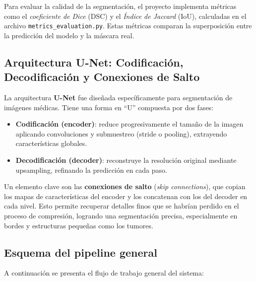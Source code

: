 \documentclass[12pt]{article}
\begin{document}
Para evaluar la calidad de la segmentación, el proyecto implementa métricas como el \textit{coeficiente de Dice} (DSC) y el \textit{Índice de Jaccard} (IoU), calculadas en el archivo \texttt{metrics\_evaluation.py}. Estas métricas comparan la superposición entre la predicción del modelo y la máscara real. \cite{taha2015metrics}

\subsection*{Arquitectura U-Net: Codificación, Decodificación y Conexiones de Salto}  
La arquitectura \textbf{U-Net} fue diseñada específicamente para segmentación de imágenes médicas. Tiene una forma en “U” compuesta por dos fases:

\begin{itemize}
  \item \textbf{Codificación (encoder)}: reduce progresivamente el tamaño de la imagen aplicando convoluciones y submuestreo (stride o pooling), extrayendo características globales.
  \item \textbf{Decodificación (decoder)}: reconstruye la resolución original mediante upsampling, refinando la predicción en cada paso.
\end{itemize}

Un elemento clave son las \textbf{conexiones de salto} (\textit{skip connections}), que copian los mapas de características del encoder y los concatenan con los del decoder en cada nivel. Esto permite recuperar detalles finos que se habrían perdido en el proceso de compresión, logrando una segmentación precisa, especialmente en bordes y estructuras pequeñas como los tumores.

\subsection{Esquema del pipeline general}
A continuación se presenta el flujo de trabajo general del sistema:
\begin{center}
\end{center}
\end{document}
